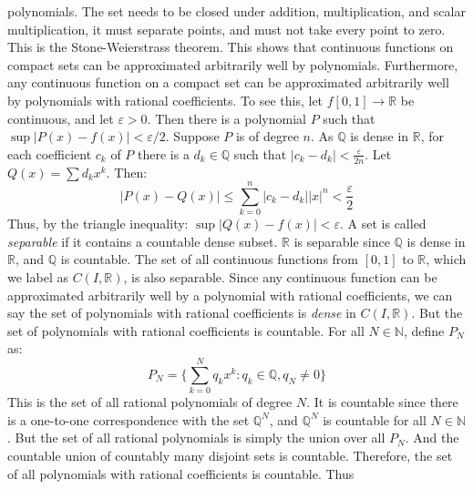     polynomials. The set needs to be closed
    under addition, multiplication, and scalar
    multiplication, it must separate points,
    and must not take every point to zero.
    This is the Stone-Weierstrass theorem.
    This shows that continuous functions on compact sets
    can be approximated arbitrarily well by polynomials.
    Furthermore, any continuous function on a compact
    set can be approximated arbitrarily well by
    polynomials with rational coefficients. To see this,
    let $f[0,1]\rightarrow\mathbb{R}$ be continuous,
    and let $\varepsilon>0$. Then there is a
    polynomial $P$ such that
    $\sup|P(x)-f(x)|<\varepsilon/2$.
    Suppose $P$ is of degree $n$.
    As $\mathbb{Q}$ is dense
    in $\mathbb{R}$, for each coefficient
    $c_{k}$ of $P$ there is a $d_{k}\in\mathbb{Q}$
    such that
    $|c_{k}-d_{k}|<\frac{\varepsilon}{2n}$.
    Let $Q(x)=\sum{d_{k}x^{k}}$. Then:
    \begin{equation}
            |P(x)-Q(x)|\leq
            \sum_{k=0}^{n}|c_{k}-d_{k}||x|^{n}
            <\frac{\varepsilon}{2}
        \end{equation}
    Thus, by the triangle inequality:
    $\sup|Q(x)-f(x)|<\varepsilon$. A set is called
    \textit{separable} if it
    contains a countable dense subset. $\mathbb{R}$
    is separable since $\mathbb{Q}$ is dense in
    $\mathbb{R}$, and $\mathbb{Q}$ is countable.
    The set of all continuous functions from
    $[0,1]$ to $\mathbb{R}$, which we label as
    $C(I,\mathbb{R})$, is also separable.
    Since any continuous function can be approximated
    arbitrarily well by a polynomial with rational
    coefficients, we can say the set of polynomials
    with rational coefficients is \textit{dense} in
    $C(I,\mathbb{R})$. But the set of polynomials with
    rational coefficients is countable. For all
    $N\in\mathbb{N}$, define $P_{N}$ as:
    \begin{equation}
            P_{N}=\Big\{\sum_{k=0}^{N}
            q_{k}x^{k}:q_{k}\in\mathbb{Q},
            q_{N}\ne{0}\Big\}
        \end{equation}
    This is the set of all rational polynomials
    of degree $N$. It is countable since there is
    a one-to-one correspondence with
    the set $\mathbb{Q}^{N}$, and $\mathbb{Q}^{N}$
    is countable for all $N\in\mathbb{N}$. But the
    set of all rational polynomials is simply the
    union over all $P_{N}$. And the countable union
    of countably many disjoint sets is countable.
    Therefore, the set of all polynomials with
    rational coefficients is countable. Thus
